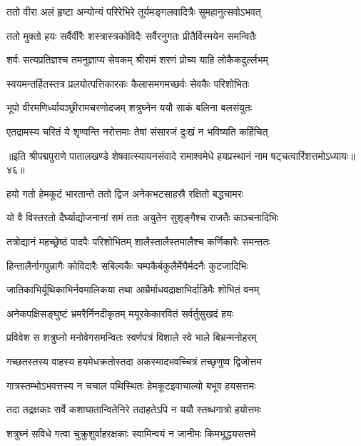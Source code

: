 \twolineshloka
{ततो वीरा अलं हृष्टा अन्योन्यं परिरेभिरे}
{तूर्यमङ्गलवादित्रैः सुमहानुत्सवोऽभवत्}%

\twolineshloka
{ततो मुक्तो हयः सर्वैर्वीरैः शस्त्रास्त्रकोविदैः}
{सर्वैरनुगतः प्रीतैर्विस्मयेन समन्वितैः}%

\twolineshloka
{शर्वः सत्यप्रतिज्ञश्च तमनुज्ञाप्य सेवकम्}
{श्रीरामं शरणं प्रोच्य याहि लोकैकदुर्ल्लभम्}%

\twolineshloka
{स्वयमन्तर्हितस्तत्र प्रलयोत्पत्तिकारकः}
{कैलासमगमच्छर्वः सेवकैः परिशोभितः}%

\twolineshloka
{भूपो वीरमणिर्ध्यायञ्छ्रीरामचरणोदजम्}
{शत्रुघ्नेन ययौ साकं बलिना बलसंयुतः}%

\twolineshloka
{एतद्रामस्य चरितं ये शृण्वन्ति नरोत्तमाः}
{तेषां संसारजं दुःखं न भविष्यति कर्हिचित्}%

{॥इति श्रीपद्मपुराणे पातालखण्डे शेषवात्स्यायनसंवादे रामाश्वमेधे हयप्रस्थानं नाम षट्चत्वारिंशत्तमोऽध्यायः॥४६॥}



\twolineshloka
{हयो गतो हेमकूटं भारतान्ते ततो द्विज}
{अनेकभटसाहस्रै रक्षितो बद्धचामरः}%

\twolineshloka
{यो वै विस्तरतो दैर्घ्याद्योजनानां समं ततः}
{अयुतेन सुशृङ्गैश्च राजतैः काञ्चनादिभिः}%

\twolineshloka
{तत्रोद्यानं महच्छ्रेष्ठं पादपैः परिशोभितम्}
{शालैस्तालैस्तमालैश्च कर्णिकारैः समन्ततः}%

\twolineshloka
{हिन्तालैर्नागपुन्नागैः कोविदारैः सबिल्वकैः}
{चम्पकैर्बकुलैर्मेघैर्मदनैः कुटजादिभिः}%

\twolineshloka
{जातिकाभिर्यूथिकाभिर्नवमालिकया तथा}
{आम्रैर्माधवद्राक्षाभिर्दाडिमैः शोभितं वनम्}%

\twolineshloka
{अनेकपक्षिसङ्घुष्टं भ्रमरैर्निनदीकृतम्}
{मयूरकेकारवितं सर्वर्तुसुखदं हयः}%

\twolineshloka
{प्रविवेश स शत्रुघ्नो मनोवेगसमन्वितः}
{स्वर्णपत्रं विशाले स्वे भाले बिभ्रन्मनोहरम्}%

\twolineshloka
{गच्छतस्तस्य वाहस्य हयमेधक्रतोस्तदा}
{अकस्मादभवच्चित्रं तच्छृणुष्व द्विजोत्तम}%

\twolineshloka
{गात्रस्तम्भोऽभवत्तस्य न चचाल पथिस्थितः}
{हेमकूटइवाचाल्यो बभूव हयसत्तमः}%

\twolineshloka
{तदा तद्रक्षकाः सर्वे कशाघातान्वितेनिरे}
{तदाहतेऽपि न ययौ स्तब्धगात्रो हयोत्तमः}%

\twolineshloka
{शत्रुघ्नं सविधे गत्वा चुक्रुशुर्वाहरक्षकाः}
{स्वामिन्वयं न जानीमः किमभूद्धयसत्तमे}%

